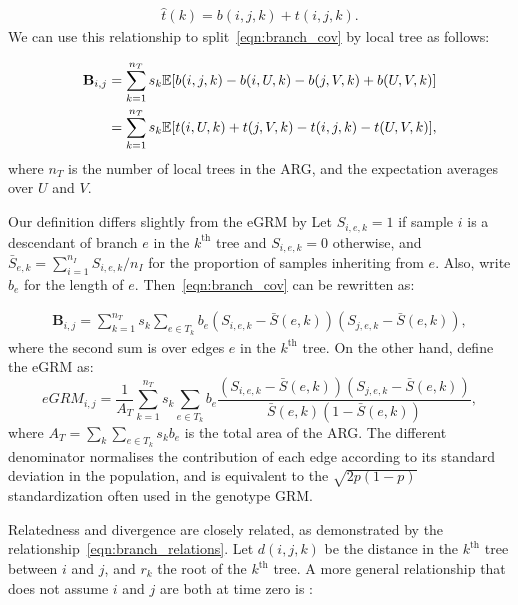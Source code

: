 \begin{align} \label{eqn:branch_relations}
    \hat{t}(k) = b(i,j,k) + t(i,j,k) .
\end{align}
%
We can use this relationship to split~\eqref{eqn:branch_cov} by local tree as follows:

%
\begin{align}
    \mathbf{B}_{i,j}
        & = \sum_{k = 1}^{n_T} s_k \mathbb{E}[b(i,j,k) - b(i,U,k) - b(j,V,k) + b(U,V,k)] \\
        & = \sum_{k = 1}^{n_T} s_k \mathbb{E}[t(i,U,k) + t(j,V,k) - t(i,j,k) - t(U,V,k)],
\end{align}
%
where $n_T$ is the number of local trees in the ARG, %
and the expectation averages over $U$ and $V$.

Our definition differs slightly from the eGRM by \citet{fan2022genealogical}
%
Let $S_{i,e,k} = 1$ if sample $i$ is a descendant of branch $e$
in the $k^\text{th}$ tree and $S_{i,e,k} = 0$ otherwise,
and $\bar{S}_{e,k} = \sum_{i=1}^{n_I} S_{i,e,k} / n_I$
for the proportion of samples inheriting from $e$.
Also, write $b_e$ for the length of $e$.
%
Then~\eqref{eqn:branch_cov} can be rewritten as:

\begin{align*}
    \mathbf{B}_{i,j}
    = \sum_{k=1}^{n_T} s_k \sum_{e \in T_k} b_e (S_{i,e,k} - \bar{S}(e,k))(S_{j,e,k} - \bar{S}(e,k)) ,
\end{align*}
where the second sum is over edges $e$ in the $k^\text{th}$ tree.
%
On the other hand, \citet{fan2022genealogical} define the eGRM as:
%
\begin{equation}
    eGRM_{i,j}
    = \frac{1}{A_T} \sum_{k=1}^{n_T} s_k \sum_{e \in T_k} b_e \frac{
        (S_{i,e,k} - \bar{S}(e,k))(S_{j,e,k} - \bar{S}(e,k)) 
        }{
        \bar{S}(e,k) (1 - \bar{S}(e,k))
        } ,
\end{equation}
where $A_T = \sum_k \sum_{e \in T_k} s_k b_e$ is the total area of the ARG.
%
The different denominator normalises the contribution of each edge according to its standard deviation in the population,
and is equivalent to the $\sqrt{2p(1-p)}$ standardization often used in the genotype GRM.

Relatedness and divergence are closely related,
as demonstrated by the relationship~\eqref{eqn:branch_relations}.
%
Let $d(i,j,k)$ be the distance in the $k^\text{th}$ tree between $i$ and $j$,
and $r_k$ the root of the $k^\text{th}$ tree.
%
A more general relationship that does not assume $i$ and $j$ are both at time zero is
\citep{semple2003phylogenetics}:
%

